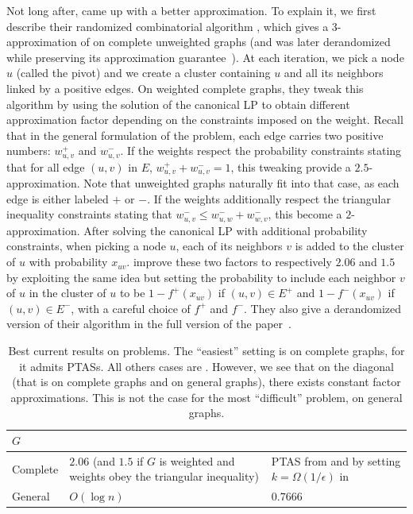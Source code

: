 Not long after, \textcite{CCPivotConf05} came up with a better approximation. To explain it, we
first describe their randomized combinatorial algorithm \ccpivot{}, which gives a $3$-approximation
of \mind{} on complete unweighted graphs (and was later derandomized while preserving its
approximation guarantee~\autocite{derandomCCPivot08}). At each iteration, we pick a node $u$ \uar{}
(called the pivot) and we create a cluster containing $u$ and all its neighbors
linked by a positive edges. On weighted complete graphs, they tweak this algorithm by using the
solution of the canonical LP to obtain different approximation factor depending on the
constraints imposed on the weight. Recall that in the general formulation of the problem, each
edge carries two positive numbers: $w_{u,v}^+$ and $w_{u,v}^-$. If the weights respect the
probability constraints stating that for all edge $(u,v)$ in $E$, $w_{u,v}^+ + w_{u,v}^- = 1$, this
tweaking provide a $2.5$-approximation. Note that unweighted graphs naturally fit into that case, as
each edge is either labeled $+$ or $-$. If the weights
additionally respect the triangular inequality constraints stating that $w_{u,v}^- \leq w_{u,w}^- +
w_{w,v}^-$, this become a $2$-approximation. After solving the canonical LP with additional
probability constraints, when picking a node $u$, each of its neighbors $v$ is added to the cluster
of $u$ with probability $x_{uv}$. \Textcite{Chawla2014} improve these two factors to respectively
$2.06$ and $1.5$ by exploiting the same idea but setting the probability to include each neighbor
$v$ of $u$ in the cluster of $u$ to be $1-f^+(x_{uv})$ if $(u,v)\in E^+$ and $1-f^-(x_{uv})$ if
$(u,v)\in E^-$, with a careful choice of $f^+$ and $f^-$. They also give a derandomized version of
their algorithm in the full version of the paper~\autocite[Theorem 23]{ChawlaArxiv14}.

\begin{table}
   \caption{Best current results on \pcc{} problems. The \enquote{easiest} setting is \maxa{} on
      complete graphs, for it admits PTASs. All others cases are \APXh{}. However, we see that on
      the diagonal (that is \mind{} on complete graphs and \maxa{} on general graphs), there exists
      constant factor approximations. This is not the case for the most \enquote{difficult} problem,
      \mind{} on general graphs. \label{tab:cc_approx}}
   \begin{tabulary}{\textwidth}{lLL}
      \toprule
      $G$      &  \mind{}                                                  & \maxa{}                                 \\
      \midrule
      Complete &  $2.06$ (and $1.5$ if $G$ is weighted and weights obey the triangular inequality) \autocite{Chawla2014}
               & PTAS from \textcite{Bansal2002} and by setting $k=\Omega(1/\epsilon)$ in \autocite{Giotis2006}      \\
      General  &  $O(\log n)$ \autocite{Charikar2003}                      & $0.7666$ \autocite{Swamy2004}           \\
      \bottomrule
   \end{tabulary}
\end{table}

